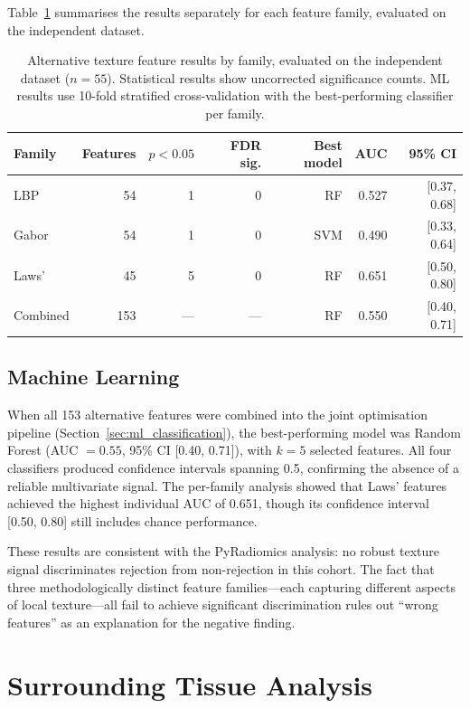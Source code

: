 Table~\ref{tab:alt_per_family} summarises the results separately for each feature family, evaluated on the independent dataset.

\begin{table}[ht]
\centering
\caption{Alternative texture feature results by family, evaluated on the independent dataset ($n = 55$). Statistical results show uncorrected significance counts. ML results use 10-fold stratified cross-validation with the best-performing classifier per family.}
\label{tab:alt_per_family}
\begin{tabular}{lrrrrrr}
\toprule
Family & Features & $p < 0.05$ & FDR sig. & Best model & AUC & 95\% CI \\
\midrule
LBP & 54 & 1 & 0 & RF & 0.527 & [0.37, 0.68] \\
Gabor & 54 & 1 & 0 & SVM & 0.490 & [0.33, 0.64] \\
Laws' & 45 & 5 & 0 & RF & 0.651 & [0.50, 0.80] \\
\midrule
Combined & 153 & --- & --- & RF & 0.550 & [0.40, 0.71] \\
\bottomrule
\end{tabular}
\end{table}

\subsection{Machine Learning}

When all 153 alternative features were combined into the joint optimisation pipeline (Section~\ref{sec:ml_classification}), the best-performing model was Random Forest (AUC $= 0.55$, 95\% CI [0.40, 0.71]), with $k = 5$ selected features. All four classifiers produced confidence intervals spanning 0.5, confirming the absence of a reliable multivariate signal. The per-family analysis showed that Laws' features achieved the highest individual AUC of 0.651, though its confidence interval [0.50, 0.80] still includes chance performance.

These results are consistent with the PyRadiomics analysis: no robust texture signal discriminates rejection from non-rejection in this cohort. The fact that three methodologically distinct feature families---each capturing different aspects of local texture---all fail to achieve significant discrimination rules out ``wrong features'' as an explanation for the negative finding.


\section{Surrounding Tissue Analysis}
\label{sec:surrounding_results}

